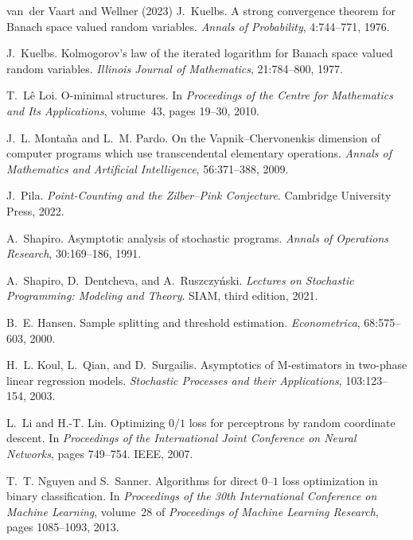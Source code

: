 \documentclass[11pt]{article}
\begin{document}
\begin{thebibliography}{van~der Vaart and Wellner (2023)}
 J.~Kuelbs. \newblock A strong
convergence theorem for {B}anach space valued random variables.
\newblock \emph{Annals of Probability}, 4:744--771, 1976.

 J.~Kuelbs. \newblock Kolmogorov's
law of the iterated logarithm for {B}anach space valued random variables.
\newblock \emph{Illinois Journal of Mathematics}, 21:784--800, 1977.

 T.~Lê Loi. \newblock O-minimal
structures. \newblock In \emph{Proceedings of the Centre for Mathematics
and Its Applications}, volume~43, pages 19--30, 2010.

 J.~L. Montaña
and L.~M. Pardo. \newblock On the {V}apnik--{C}hervonenkis
dimension of computer programs which use transcendental elementary
operations. \newblock \emph{Annals of Mathematics and Artificial
Intelligence}, 56:371--388, 2009.

 J.~Pila. \newblock \emph{Point-Counting
and the Zilber--Pink Conjecture}. \newblock Cambridge University
Press, 2022.

 A.~Shapiro. \newblock Asymptotic
analysis of stochastic programs. \newblock \emph{Annals of Operations
Research}, 30:169--186, 1991.

A.~Shapiro, D.~Dentcheva, and A.~Ruszczyński. \newblock \emph{Lectures
on Stochastic Programming: Modeling and Theory}. \newblock SIAM,
third edition, 2021.

 B.~E. Hansen. \newblock Sample
splitting and threshold estimation. \newblock \emph{Econometrica},
68:575--603, 2000.

H.~L. Koul, L.~Qian, and D.~Surgailis. \newblock Asymptotics of
{M}-estimators in two-phase linear regression models. \newblock
\emph{Stochastic Processes and their Applications}, 103:123--154,
2003.

 L.~Li and H.-T. Lin. \newblock
Optimizing $0/1$ loss for perceptrons by random coordinate descent.
\newblock In \emph{Proceedings of the International Joint Conference
on Neural Networks}, pages 749--754. IEEE, 2007.

 T.~T. Nguyen
and S.~Sanner. \newblock Algorithms for direct $0$--$1$ loss
optimization in binary classification. \newblock In \emph{Proceedings
of the 30th International Conference on Machine Learning}, volume~28
of \emph{Proceedings of Machine Learning Research}, pages 1085--1093,
2013.


\end{thebibliography}
\end{document}
